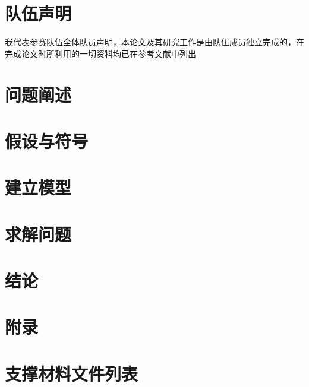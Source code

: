 \documentclass[zihao=-4,UTF8]{ctexart}
\begin{document}
\section*{队伍声明}

我代表参赛队伍全体队员声明，本论文及其研究工作是由队伍成员独立完成的，在完成论文时所利用的一切资料均已在参考文献中列出 
\newpage

\section{问题阐述}

\section{假设与符号}

\section{建立模型}

\section{求解问题}

\newpage
\section*{结论}


\newpage
\section*{附录}


\section*{支撑材料文件列表}
\end{document}
